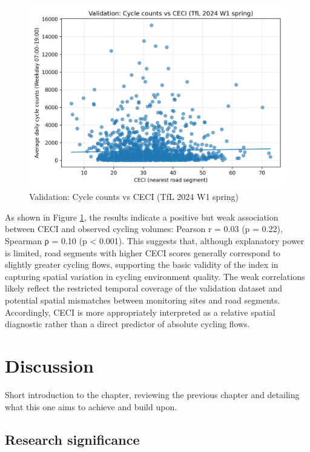 \documentclass[
  12pt,
  oneside]{book}
\begin{document}
\begin{figure}

{\centering \includegraphics[width=0.9\linewidth]{general_images/validation} 

}

\caption{Validation: Cycle counts vs CECI (TfL 2024 W1 spring)}\label{fig:validation}
\end{figure}

As shown in Figure \ref{fig:validation}, the results indicate a positive but weak association between CECI and observed cycling volumes: Pearson r = 0.03 (p = 0.22), Spearman ρ = 0.10 (p \textless{} 0.001). This suggests that, although explanatory power is limited, road segments with higher CECI scores generally correspond to slightly greater cycling flows, supporting the basic validity of the index in capturing spatial variation in cycling environment quality. The weak correlations likely reflect the restricted temporal coverage of the validation dataset and potential spatial mismatches between monitoring sites and road segments. Accordingly, CECI is more appropriately interpreted as a relative spatial diagnostic rather than a direct predictor of absolute cycling flows.

\chapter{Discussion}\label{discussion}

Short introduction to the chapter, reviewing the previous chapter and detailing what this one aims to achieve and build upon.

\section{Research significance}\label{research-significance}
\end{document}
